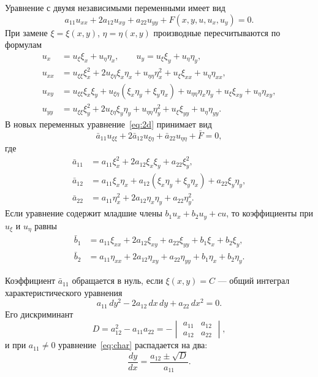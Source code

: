 \documentclass[a4paper,12pt]{article}
\begin{document}
Уравнение с двумя независимыми переменными имеет вид
\begin{equation}\label{eq:2d}
  a_{11}u_{xx}+2a_{12}u_{xy}+a_{22}u_{yy}+F(x,y,u,u_x,u_y)=0.
\end{equation}
При замене $\xi=\xi(x,y)$, $\eta=\eta(x,y)$ производные пересчитываются по формулам
\begin{align*}
  u_x    &= u_\xi\xi_x+u_\eta\eta_x, \qquad u_y = u_\xi\xi_y+u_\eta\eta_y,\\
  u_{xx} &= u_{\xi\xi}\xi_x^2+2u_{\xi\eta}\xi_x\eta_x+u_{\eta\eta}\eta_x^2
            +u_\xi\xi_{xx}+u_\eta\eta_{xx},\\
  u_{xy} &= u_{\xi\xi}\xi_x\xi_y+u_{\xi\eta}(\xi_x\eta_y+\xi_y\eta_x)
            +u_{\eta\eta}\eta_x\eta_y+u_\xi\xi_{xy}+u_\eta\eta_{xy},\\
  u_{yy} &= u_{\xi\xi}\xi_y^2+2u_{\xi\eta}\xi_y\eta_y+u_{\eta\eta}\eta_y^2
            +u_\xi\xi_{yy}+u_\eta\eta_{yy}.
\end{align*}
В новых переменных уравнение~\eqref{eq:2d} принимает вид
\begin{equation}\label{eq:2dnew}
  \bar a_{11}u_{\xi\xi}+2\bar a_{12}u_{\xi\eta}+\bar a_{22}u_{\eta\eta}+\bar F=0,
\end{equation}
где
\begin{equation}\label{eq:abar}
\begin{aligned}
  \bar a_{11}&=a_{11}\xi_x^2+2a_{12}\xi_x\xi_y+a_{22}\xi_y^2,\\
  \bar a_{12}&=a_{11}\xi_x\eta_x+a_{12}(\xi_x\eta_y+\xi_y\eta_x)+a_{22}\xi_y\eta_y,\\
  \bar a_{22}&=a_{11}\eta_x^2+2a_{12}\eta_x\eta_y+a_{22}\eta_y^2.
\end{aligned}
\end{equation}
Если уравнение содержит младшие члены $b_1u_x+b_2u_y+cu$, то коэффициенты при
$u_\xi$ и $u_\eta$ равны
\begin{equation}\label{eq:bbar}
\begin{aligned}
  \bar b_1&=a_{11}\xi_{xx}+2a_{12}\xi_{xy}+a_{22}\xi_{yy}+b_1\xi_x+b_2\xi_y,\\
  \bar b_2&=a_{11}\eta_{xx}+2a_{12}\eta_{xy}+a_{22}\eta_{yy}+b_1\eta_x+b_2\eta_y.
\end{aligned}
\end{equation}

Коэффициент $\bar a_{11}$ обращается в нуль, если $\xi(x,y)=C$ --- общий интеграл
характеристического уравнения
\begin{equation}\label{eq:char}
  a_{11}\,dy^2-2a_{12}\,dx\,dy+a_{22}\,dx^2=0.
\end{equation}
Его дискриминант
\begin{equation}\label{eq:D}
  D=a_{12}^2-a_{11}a_{22}
   =-\begin{vmatrix}a_{11}&a_{12}\\ a_{12}&a_{22}\end{vmatrix},
\end{equation}
и при $a_{11}\neq0$ уравнение~\eqref{eq:char} распадается на два:
\begin{equation}\label{eq:roots}
  \frac{dy}{dx}=\frac{a_{12}\pm\sqrt{D}}{a_{11}}.
\end{equation}
\end{document}
